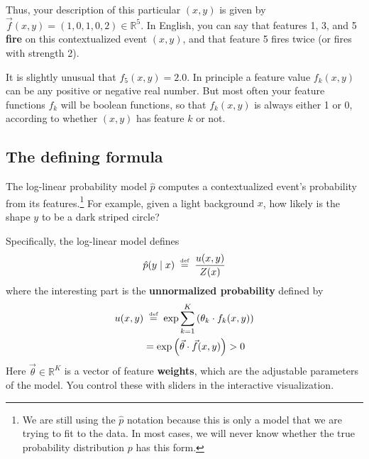 \documentclass[11pt]{article}
\newcommand{\defeq}{\;\stackrel{\mbox{\tiny def}}{=}\;}
\newcommand{\vtheta}{\vec{\theta}}
\newcommand{\ph}{\hat{p}}
\newcommand{\Real}{{\mathbb R}}
\begin{document}
\noindent Thus, your description of this particular $(x,y)$ is given by
$\vec{f}(x,y)=(1,0,1,0,2) \in \Real^5$.  In English, you can say
that features 1, 3, and 5 {\bf fire} on this contextualized event
$(x,y)$, and that feature 5 fires twice (or fires with strength 2).

% 

\medskip

It is slightly unusual that $f_5(x,y)=2.0$.  In principle a feature
value $f_k(x,y)$ can be any positive or negative real number.  But
most often your feature functions $f_k$ will be boolean functions, so
that $f_k(x,y)$ is always either 1 or 0, according to whether $(x,y)$
has feature $k$ or not.

\subsection{The defining formula}\label{sec:formula}

The log-linear probability model $\ph$ computes a contextualized
event's probability from its features.\footnote{We are still using the
  $\ph$ notation because this is only a model that we are trying to
  fit to the data.  In most cases, we will never know whether the true
  probability distribution $p$ has this form.}  For example, given a
light background $x$, how likely is the shape $y$ to be a dark striped circle?

Specifically, the log-linear model defines
\begin{equation}\label{eqn:loglin}
  \ph(y \mid x) \defeq \frac{u(x,y)}{Z(x)}
\end{equation}
where the interesting part is the {\bf unnormalized probability}
defined by
\begin{align}\label{eqn:unnorm}
  u(x,y) &\defeq \exp \sum_{k=1}^K \left( \theta_k \cdot f_k(x,y) \right)  \\
         &= \exp \left(\vtheta \cdot \vec{f}(x,y)\right) > 0
\end{align}
Here $\vtheta \in \Real^K$ is a vector of feature {\bf weights}, which
are the adjustable parameters of the model.  You control these
with sliders in the interactive visualization.  
\end{document}

